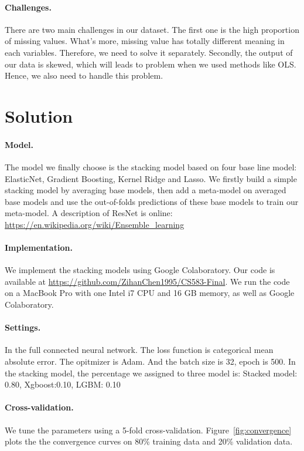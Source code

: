 \documentclass[11pt]{article}
\numberwithin{equation}{section}
\begin{document}
\paragraph{Challenges.}
There are two main challenges in our dataset. The first one is the high proportion of missing values. What's more, missing value has totally different meaning in each variables. Therefore, we need to solve it separately. Secondly, the output of our data is skewed, which will leads to problem when we used methods like OLS. Hence, we also need to handle this problem.


\section{Solution}

\paragraph{Model.}
The model we finally choose is the stacking model based on four base line model: ElasticNet, Gradient Boosting, Kernel Ridge and Lasso. We firstly build a simple stacking model by averaging base models, then add a meta-model on averaged base models and use the out-of-folds predictions of these base models to train our meta-model. A description of ResNet is online: \url{https://en.wikipedia.org/wiki/Ensemble_learning}


\paragraph{Implementation.}
We implement the stacking models using Google Colaboratory. 
Our code is available at \url{https://github.com/ZihanChen1995/CS583-Final}.
We run the code on a MacBook Pro with one Intel i7 CPU and 16 GB memory, as well as Google Colaboratory.


\paragraph{Settings.}
In the full connected neural network. The loss function is categorical mean absolute error. The opitmizer is Adam. And the batch size is 32, epoch is 500. In the stacking model, the percentage we assigned to three model is: Stacked model: 0.80, Xgboost:0.10, LGBM: 0.10


\paragraph{Cross-validation.}
We tune the parameters using a 5-fold cross-validation. 
Figure~\ref{fig:convergence} plots the the convergence curves on 80\% training data and 20\% validation data.
\end{document}
